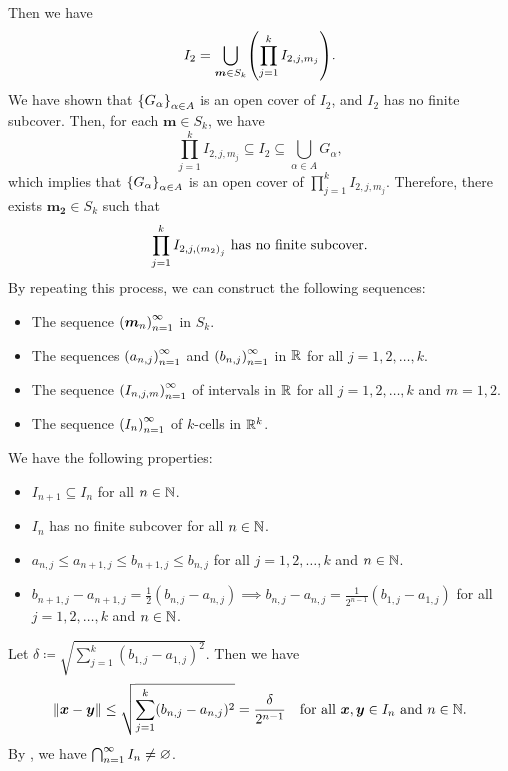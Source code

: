     Then we have
    \[
    I_{2} = \bigcup_{\bm{m} \in S_{k}} \paren*{\prod_{j = 1}^{k} I_{2, j, m_{j}}}.
    \]
    We have shown that $\set*{G_{\alpha}}_{\alpha \in A}$ is an open cover of $I_{2}$, and $I_{2}$ has no finite subcover.
    Then, for each $\bm{m} \in S_{k}$, we have
    \[
    \prod_{j = 1}^{k} I_{2, j, m_{j}} \subseteq I_{2} \subseteq \bigcup_{\alpha \in A} G_{\alpha},
    \]
    which implies that $\set*{G_{\alpha}}_{\alpha \in A}$ is an open cover of
    $\prod_{j = 1}^{k} I_{2, j, m_{j}}$. Therefore, there exists $\bm{m_{2}} \in S_{k}$ such that
    \[
    \prod_{j = 1}^{k} I_{2, j, \paren*{m_{2}}_{j}} \text{ has no finite subcover}.
    \]
    By repeating this process, we can construct the following sequences:
    \begin{itemize}
        \item The sequence $\paren*{\bm{m}_{n}}_{n = 1}^{\infty}$ in $S_{k}$.
        \item The sequences $\paren*{a_{n, j}}_{n = 1}^{\infty}$ and
        $\paren*{b_{n, j}}_{n = 1}^{\infty}$ in $\R$ for all $j = 1, 2, \dots, k$.
        \item The sequence $\paren*{I_{n, j, m}}_{n = 1}^{\infty}$ of intervals in $\R$
        for all $j = 1, 2, \dots, k$ and $m = 1, 2$.
        \item The sequence $\paren*{I_{n}}_{n = 1}^{\infty}$ of $k$-cells in $\R^{k}$.
    \end{itemize}
    We have the following properties:
    \begin{itemize}
        \item $I_{n + 1} \subseteq I_{n}$ for all $n \in \N$.
        \item $I_{n}$ has no finite subcover for all $n \in \N$.
        \item $a_{n, j} \leq a_{n + 1, j} \leq b_{n + 1, j} \leq b_{n, j}$ for all $j = 1, 2, \dots, k$ and $n \in \N$.
        \item $b_{n + 1, j} - a_{n + 1, j} = \frac{1}{2}(b_{n, j} - a_{n, j}) \implies b_{n, j} - a_{n, j} =
        \frac{1}{2^{n - 1}}(b_{1, j} - a_{1, j})$ for all $j = 1, 2, \dots, k$ and $n \in \N$.
    \end{itemize}
    Let $\delta \coloneqq \sqrt{\sum_{j = 1}^{k} (b_{1, j} - a_{1, j})^{2}}$. Then we have
    \[
    \norm*{\bm{x} - \bm{y}} \leq \sqrt{\sum_{j = 1}^{k} (b_{n, j} - a_{n, j})^{2}} =
    \frac{\delta}{2^{n - 1}} \quad \text{for all } \bm{x}, \bm{y} \in I_{n} \text{ and } n \in \N.
    \]
    By , we have $\bigcap_{n = 1}^{\infty} I_{n} \neq \vnot$.
